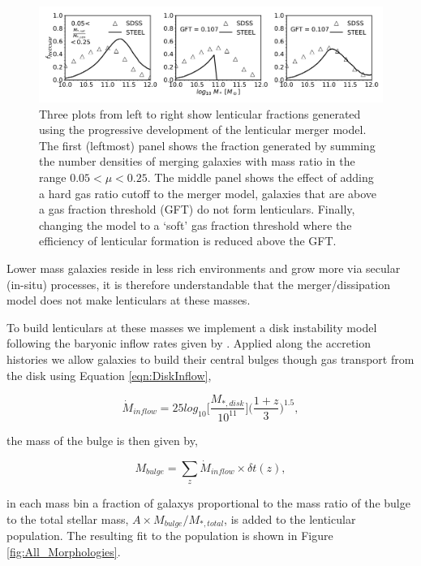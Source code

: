 \begin{figure}
  \includegraphics[width=\linewidth]{Figures/Chapter5/Lenticular_three.pdf}
    \caption{Three plots from left to right show lenticular fractions generated using the progressive development of the lenticular merger model. The first (leftmost) panel shows the fraction generated by summing the number densities of merging galaxies with mass ratio in the range $0.05 < \mu < 0.25$. The middle panel shows the effect of adding a hard gas ratio cutoff to the merger model, galaxies that are above a gas fraction threshold (GFT) do not form lenticulars. Finally, changing the model to a `soft' gas fraction threshold where the efficiency of lenticular formation is reduced above the GFT.}
    \label{fig:Lentcular_panels}
\end{figure}

Lower mass galaxies reside in less rich environments and grow more via secular (in-situ) processes, it is therefore understandable that the merger/dissipation model does not make lenticulars at these masses.

To build lenticulars at these masses we implement a disk instability model following the baryonic inflow rates given by \citet{Bournaud2011BLACKSTREAMS}. Applied along the accretion histories we allow galaxies to build their central bulges though gas transport from the disk using Equation \ref{eqn:DiskInflow}, 

\begin{equation}
    \label{eqn:DiskInflow}
    \dot{M}_{inflow} = 25 log_{10}\Big[\frac{M_{*,disk}}{10^{11}}\Big]\Big(\frac{1 + z}{3}\Big)^{1.5},
\end{equation}

the mass of the bulge is then given by,

\begin{equation}
    M_{bulge} = \sum_z \dot{M}_{inflow} \times \delta t(z),
\end{equation}

in each mass bin a fraction of galaxys proportional to the mass ratio of the bulge to the total stellar mass, $A \times M_{bulge} / M_{*, total}$, is added to the lenticular population. The resulting fit to the population is shown in Figure \ref{fig:All_Morphologies}.

